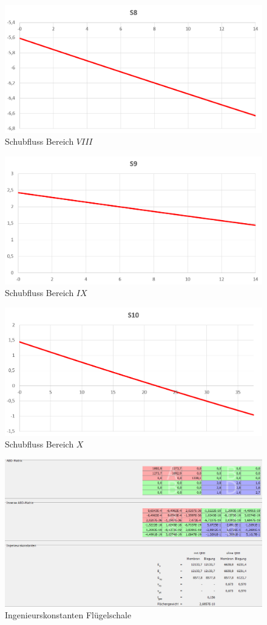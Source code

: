 \begin{figure}
	\includegraphics[width=1.0\textwidth]{Bilder/S8.png}
	\caption{Schubfluss Bereich $VIII$}
	\label{fig:S8}
\end{figure}
\begin{figure}
	\includegraphics[width=1.0\textwidth]{Bilder/S9.png}
	\caption{Schubfluss Bereich $IX$}
	\label{fig:S9}
\end{figure}
\begin{figure}
	\includegraphics[width=1.0\textwidth]{Bilder/S10.png}
	\caption{Schubfluss Bereich $X$}
	\label{fig:S10}
\end{figure}
\begin{figure}
	\includegraphics[width=1.0\textwidth]{Bilder/Konstanten Haut.png}
	\caption{Ingenieurskonstanten Flügelschale}
	\label{fig:Ingenieurskonstanten Haut}
\end{figure}

